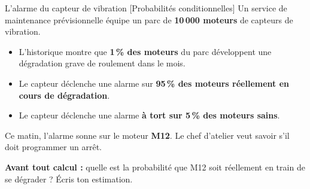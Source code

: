 \documentclass[a4paper,11pt]{article}
\begin{document}
\begin{exo}{L'alarme du capteur de vibration \hfill \normalfont\color{uimmlightblue}[Probabilités conditionnelles]}
Un service de maintenance prévisionnelle équipe un parc de \textbf{10\,000 moteurs} de capteurs de vibration.

\begin{itemize}
  \item L'historique montre que \textbf{1\,\% des moteurs} du parc développent une dégradation grave de roulement dans le mois.
  \item Le capteur déclenche une alarme sur \textbf{95\,\% des moteurs réellement en cours de dégradation}.
  \item Le capteur déclenche une alarme \textbf{à tort sur 5\,\% des moteurs sains}.
\end{itemize}

Ce matin, l'alarme sonne sur le moteur \textbf{M12}. Le chef d'atelier veut savoir s'il doit programmer un arrêt.

\begin{intuition}
\textbf{Avant tout calcul :} quelle est la probabilité que M12 soit réellement en train de se dégrader ? Écris ton estimation. \dotfill
\end{intuition}


\end{exo}
\end{document}
